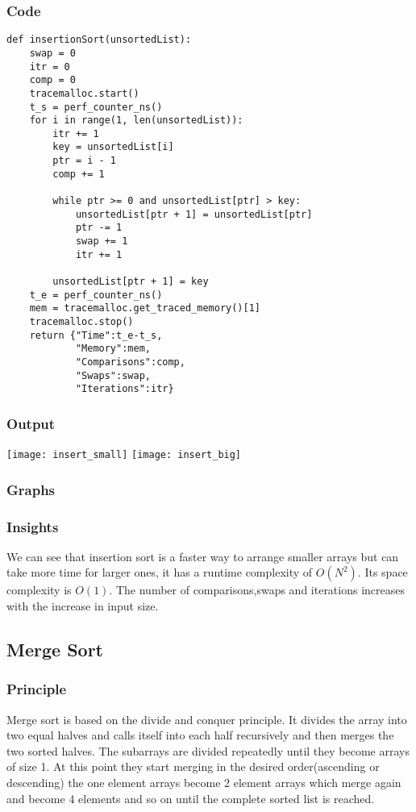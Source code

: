 \documentclass[12pt]{article}
\begin{document}
\subsubsection*{Code}
\begin{verbatim}
def insertionSort(unsortedList):
    swap = 0
    itr = 0
    comp = 0
    tracemalloc.start()
    t_s = perf_counter_ns()
    for i in range(1, len(unsortedList)):
        itr += 1
        key = unsortedList[i]
        ptr = i - 1
        comp += 1

        while ptr >= 0 and unsortedList[ptr] > key:
            unsortedList[ptr + 1] = unsortedList[ptr]
            ptr -= 1
            swap += 1
            itr += 1

        unsortedList[ptr + 1] = key
    t_e = perf_counter_ns()
    mem = tracemalloc.get_traced_memory()[1]
    tracemalloc.stop()
    return {"Time":t_e-t_s,
            "Memory":mem,
            "Comparisons":comp,
            "Swaps":swap,
            "Iterations":itr}
\end{verbatim}
\subsubsection*{Output}
\texttt{[image: insert\_small]}
\texttt{[image: insert\_big]}
\subsubsection*{Graphs}





\subsubsection*{Insights}
We can see that insertion sort is a faster way to arrange smaller
arrays but can take more time for larger ones, it has a runtime
complexity of $O(N^2)$. Its space complexity is $O(1)$. The number of
comparisons,swaps and iterations increases with the increase in
input size.
\subsection{Merge Sort}
\subsubsection*{Principle}
Merge sort is based on the divide and conquer principle. It
divides the array into two equal halves and calls itself into
each half recursively and then merges the two sorted halves. The
subarrays are divided repeatedly until they become arrays of size
1. At this point they start merging in the desired
order(ascending or descending) the one element arrays become 2
element arrays which merge again and become 4 elements and so on
until the complete sorted list is reached.
\end{document}
